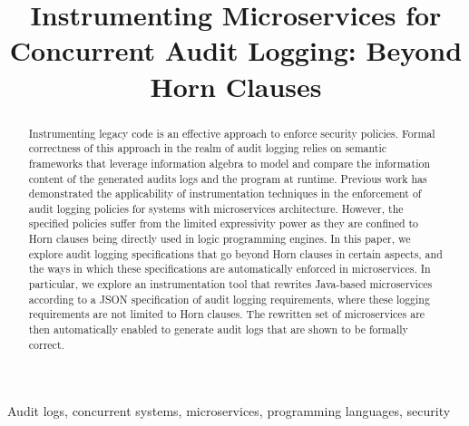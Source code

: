 \title{Instrumenting Microservices for Concurrent Audit Logging: Beyond Horn Clauses}


\author{
\and
{}
}

\maketitle

\begin{abstract}
Instrumenting legacy code is an effective approach to enforce security policies. %
Formal correctness of this approach in the realm of audit logging relies on semantic frameworks that leverage information algebra to model and compare the information content of the generated audits logs and the program at runtime.  Previous work has demonstrated the applicability of instrumentation techniques in the enforcement of audit logging policies for systems with microservices architecture. However, the specified policies suffer from the limited expressivity power as they are confined to Horn clauses being directly used in logic programming engines. In this paper, we explore audit logging specifications that go beyond Horn clauses in certain aspects, and the ways in which these specifications are automatically enforced in microservices. In particular, we explore an instrumentation tool that rewrites Java-based microservices according to a JSON specification of audit logging requirements, where these logging requirements are not limited to Horn clauses. The rewritten set of microservices are then automatically enabled to generate audit logs that are shown to be formally correct.
\end{abstract}

\begin{IEEEkeywords}
Audit logs, concurrent systems, microservices, programming languages, security
\end{IEEEkeywords}
